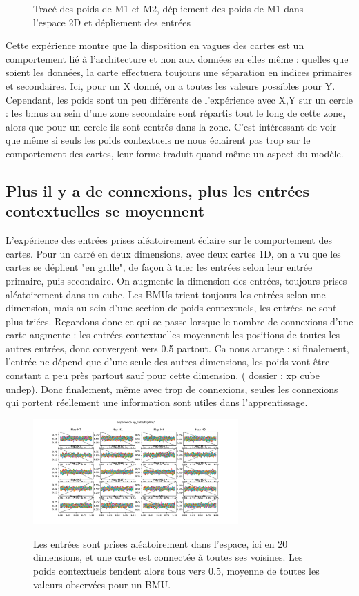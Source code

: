 \begin{figure}[h!]
\begin{minipage}{0.33\textwidth}
\end{minipage}
\label{fig:2som_square}
\caption{Tracé des poids de M1 et M2, dépliement des poids de M1 dans l'espace 2D et dépliement des entrées}
\end{figure}

Cette expérience montre que la disposition en vagues des cartes est un comportement lié à l'architecture et non aux données en elles même : quelles que soient les données, la carte effectuera toujours une séparation en indices primaires et secondaires. Ici, pour un X donné, on a toutes les valeurs possibles pour Y.
Cependant, les poids sont un peu différents de l'expérience avec X,Y sur un cercle : les bmus au sein d'une zone secondaire sont répartis tout le long de cette zone, alors que pour un cercle ils sont centrés dans la zone.
C'est intéressant de voir que même si seuls les poids contextuels ne nous éclairent pas trop sur le comportement des cartes, leur forme traduit quand même un aspect du modèle. 


\subsection{Plus il y a de connexions, plus les entrées contextuelles se moyennent}

L'expérience des entrées prises aléatoirement éclaire sur le comportement des cartes. Pour un carré en deux dimensions, avec deux cartes 1D, on a vu que les cartes se déplient "en grille", de façon à trier les entrées selon leur entrée primaire, puis secondaire. 
On augmente la dimension des entrées, toujours prises aléatoirement dans un cube. Les BMUs trient toujours les entrées selon une dimension, mais au sein d'une section de poids contextuels, les entrées ne sont plus triées.
Regardons donc ce qui se passe lorsque le nombre de connexions d'une carte augmente : les entrées contextuelles moyennent les positions de toutes les autres entrées, donc convergent vers 0.5 partout.
Ca nous arrange : si finalement, l'entrée ne dépend que d'une seule des autres dimensions, les poids vont être constant a peu près partout sauf pour cette dimension. ( dossier : xp cube undep). Donc finalement, même avec trop de connexions, seules les connexions qui portent réellement une information sont utiles dans l'apprentissage.


\begin{figure}
\includegraphics[width=0.7\textwidth]{xp_cube_bigdim}
\label{fig:bigdim}
\caption{Les entrées sont prises aléatoirement dans l'espace, ici en 20 dimensions, et une carte est connectée à toutes ses voisines. Les poids contextuels tendent alors tous vers 0.5, moyenne de toutes les valeurs observées pour un BMU.
}
\end{figure}

